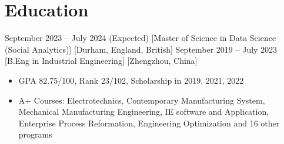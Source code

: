 \documentclass{chicv}
\begin{document}
\begin{basicinfo}
\end{basicinfo}

\section{Education}
  {September 2023 -- July 2024 (Expected)}
  [Master of Science in Data Science (Social Analytics)]
  [Durham, England, British]
  {September 2019 -- July 2023}
  [B.Eng in Industrial Engineering]
  [Zhengzhou, China]
  \begin{itemize}
    \item GPA 82.75/100, Rank 23/102, Scholarship in 2019, 2021, 2022
    \item A+ Courses: Electrotechnics, Contemporary Manufacturing System, Mechanical Manufacturing Engineering, IE software and Application, Enterprise Process Reformation, Engineering Optimization and 16 other programs
  \end{itemize}
\end{document}
